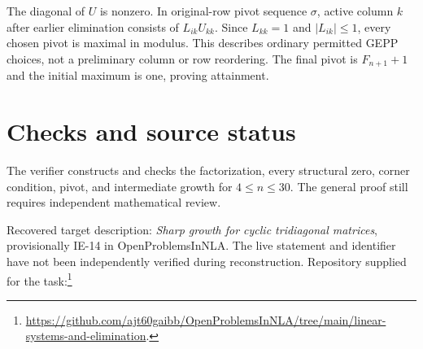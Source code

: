 \documentclass[11pt]{article}
\begin{document}
The diagonal of $U$ is nonzero. In original-row pivot sequence $\sigma$, active column $k$ after earlier elimination consists of $L_{ik}U_{kk}$. Since $L_{kk}=1$ and $|L_{ik}|\le1$, every chosen pivot is maximal in modulus. This describes ordinary permitted GEPP choices, not a preliminary column or row reordering. The final pivot is $F_{n+1}+1$ and the initial maximum is one, proving attainment.
\section{Checks and source status}
The verifier constructs and checks the factorization, every structural zero, corner condition, pivot, and intermediate growth for $4\le n\le30$. The general proof still requires independent mathematical review.

Recovered target description: \emph{Sharp growth for cyclic tridiagonal matrices}, provisionally IE-14 in OpenProblemsInNLA. The live statement and identifier have not been independently verified during reconstruction. Repository supplied for the task:\footnote{\url{https://github.com/ajt60gaibb/OpenProblemsInNLA/tree/main/linear-systems-and-elimination}.}
\end{document}
